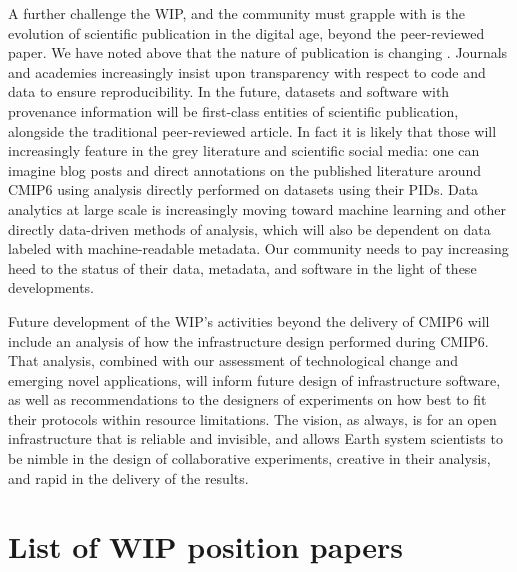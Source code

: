 \documentclass[gmd,manuscript]{copernicus}
\begin{document}
A further challenge the WIP, and the community must grapple with is
the evolution of scientific publication in the digital age, beyond the
peer-reviewed paper. We have noted above that the nature of
publication is changing \citep[see e.g][]{ref:davidetal2016}. Journals
and academies increasingly insist upon transparency with respect to
code and data to ensure reproducibility. In the future, datasets and
software with provenance information will be first-class entities of
scientific publication, alongside the traditional peer-reviewed
article. In fact it is likely that those will increasingly feature in
the grey literature and scientific social media: one can imagine blog
posts and direct annotations on the published literature around CMIP6
using analysis directly performed on datasets using their PIDs. Data
analytics at large scale is increasingly moving toward machine
learning and other directly data-driven methods of analysis, which
will also be dependent on data labeled with machine-readable metadata.
Our community needs to pay increasing heed to the status of their
data, metadata, and software in the light of these developments.

Future development of the WIP's activities beyond the delivery of
CMIP6 will include an analysis of how the infrastructure design
performed during CMIP6. That analysis, combined with our assessment of
technological change and emerging novel applications, will inform
future design of infrastructure software, as well as recommendations
to the designers of experiments on how best to fit their protocols
within resource limitations. The vision, as always, is for an open
infrastructure that is reliable and invisible, and allows Earth system
scientists to be nimble in the design of collaborative experiments,
creative in their analysis, and rapid in the delivery of the results.

\appendix

\section{List of WIP position papers}
\label{sec:wip}
\end{document}
